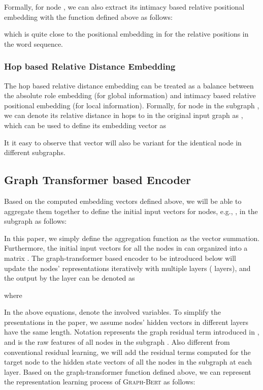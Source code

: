 \documentclass{article}
\newcommand{\our}{\textsc{Graph-Bert}}
\begin{document}
Formally, for node , we can also extract its intimacy based relative positional embedding with the  function defined above as follows:

which is quite close to the positional embedding in \cite{VSPUJGKP17} for the relative positions in the word sequence.

\vspace{-3pt}
\subsubsection{Hop based Relative Distance Embedding}

The hop based relative distance embedding can be treated as a balance between the absolute role embedding (for global information) and intimacy based relative positional embedding (for local information). Formally, for node  in the subgraph , we can denote its relative distance in hops to  in the original input graph as , which can be used to define its embedding vector as

It it easy to observe that vector  will also be variant for the identical node  in different subgraphs. 




\subsection{Graph Transformer based Encoder}

Based on the computed embedding vectors defined above, we will be able to aggregate them together to define the initial input vectors for nodes, e.g., , in the subgraph  as follows: 

In this paper, we simply define the aggregation function as the vector summation. Furthermore, the initial input vectors for all the nodes in  can organized into a matrix . The graph-transformer based encoder to be introduced below will update the nodes' representations iteratively with multiple layers ( layers), and the output by the  layer can be denoted as\vspace{-4pt}

where

In the above equations,  denote the involved variables. To simplify the presentations in the paper, we assume nodes' hidden vectors in different layers have the same length. Notation  represents the graph residual term introduced in \cite{Zhang2019GResNetGR}, and  is the raw features of all nodes in the subgraph . Also different from conventional residual learning, we will add the residual terms computed for the target node  to the hidden state vectors of all the nodes in the subgraph at each layer. Based on the graph-transformer function defined above, we can represent the representation learning process of {\our} as follows:
\end{document}
